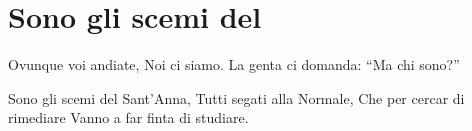 \section{Sono gli scemi del \santanna}
\subtitle{Il primo verso capocoro e poi tutti, il secondo tutti assieme}
\begin{canzone}
Ovunque voi andiate,
Noi ci siamo.
La genta ci domanda:
“Ma chi sono?”

Sono gli scemi del Sant’Anna,
Tutti segati alla Normale,
Che per cercar di rimediare
Vanno a far finta di studiare. 
\end{canzone}
